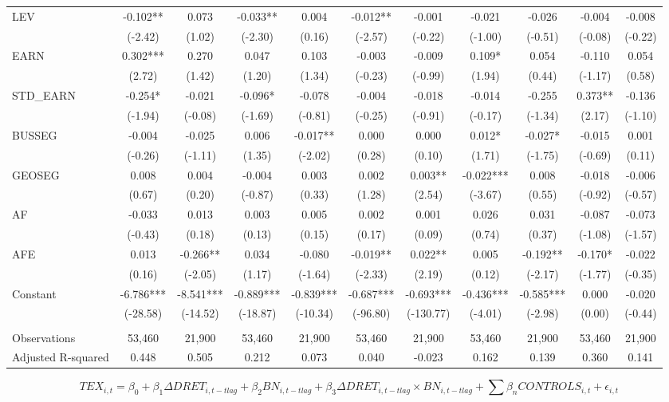 \begin{table}[H]
\begin{center}
\begin{tabular}{lcccccccccc}
			LEV & -0.102** & 0.073 & -0.033** & 0.004 & -0.012** & -0.001 & -0.021 & -0.026 & -0.004 & -0.008 \\
			& (-2.42) & (1.02) & (-2.30) & (0.16) & (-2.57) & (-0.22) & (-1.00) & (-0.51) & (-0.08) & (-0.22) \\
			EARN & 0.302*** & 0.270 & 0.047 & 0.103 & -0.003 & -0.009 & 0.109* & 0.054 & -0.110 & 0.054 \\
			& (2.72) & (1.42) & (1.20) & (1.34) & (-0.23) & (-0.99) & (1.94) & (0.44) & (-1.17) & (0.58) \\
			STD\_EARN & -0.254* & -0.021 & -0.096* & -0.078 & -0.004 & -0.018 & -0.014 & -0.255 & 0.373** & -0.136 \\
			& (-1.94) & (-0.08) & (-1.69) & (-0.81) & (-0.25) & (-0.91) & (-0.17) & (-1.34) & (2.17) & (-1.10) \\
			BUSSEG & -0.004 & -0.025 & 0.006 & -0.017** & 0.000 & 0.000 & 0.012* & -0.027* & -0.015 & 0.001 \\
			& (-0.26) & (-1.11) & (1.35) & (-2.02) & (0.28) & (0.10) & (1.71) & (-1.75) & (-0.69) & (0.11) \\
			GEOSEG & 0.008 & 0.004 & -0.004 & 0.003 & 0.002 & 0.003** & -0.022*** & 0.008 & -0.018 & -0.006 \\
			& (0.67) & (0.20) & (-0.87) & (0.33) & (1.28) & (2.54) & (-3.67) & (0.55) & (-0.92) & (-0.57) \\
			AF & -0.033 & 0.013 & 0.003 & 0.005 & 0.002 & 0.001 & 0.026 & 0.031 & -0.087 & -0.073 \\
			& (-0.43) & (0.18) & (0.13) & (0.15) & (0.17) & (0.09) & (0.74) & (0.37) & (-1.08) & (-1.57) \\
			AFE & 0.013 & -0.266** & 0.034 & -0.080 & -0.019** & 0.022** & 0.005 & -0.192** & -0.170* & -0.022 \\
			& (0.16) & (-2.05) & (1.17) & (-1.64) & (-2.33) & (2.19) & (0.12) & (-2.17) & (-1.77) & (-0.35) \\
			Constant & -6.786*** & -8.541*** & -0.889*** & -0.839*** & -0.687*** & -0.693*** & -0.436*** & -0.585*** & 0.000 & -0.020 \\
			& (-28.58) & (-14.52) & (-18.87) & (-10.34) & (-96.80) & (-130.77) & (-4.01) & (-2.98) & (0.00) & (-0.44) \\
			&   &   &   &   &   &   &   &   &   &  \\
			Observations & 53,460 & 21,900 & 53,460 & 21,900 & 53,460 & 21,900 & 53,460 & 21,900 & 53,460 & 21,900 \\
			Adjusted R-squared & 0.448 & 0.505 & 0.212 & 0.073 & 0.040 & -0.023 & 0.162 & 0.139 & 0.360 & 0.141 \\
			\bottomrule
			\bottomrule
		\end{tabular}%
	\end{center}
		\begin{footnotesize}
			\setcounter{equation}{0}
			\begin{equation}
				TEX_{i,t}=\beta_0+\beta_1\Delta DRET_{i,t-tlag}+\beta_2BN_{i,t-tlag}+\beta_3\Delta DRET_{i,t-tlag}\times 	BN_{i,t-tlag}+\sum\beta_nCONTROLS_{i,t}+\epsilon_{i,t}
			\end{equation}
			

\end{footnotesize}
\end{table}
